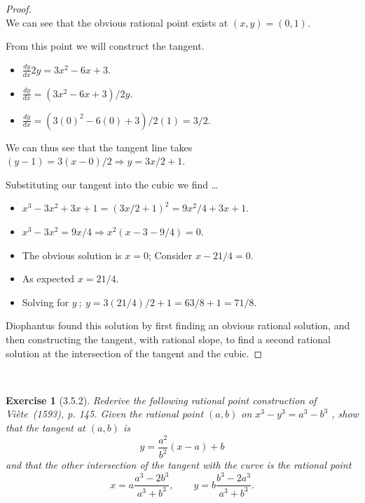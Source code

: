 \documentclass[12pt]{article}
\newcommand{\XB}{\color{black}}
\newcommand{\XBB}{\color{blue}}
\newcommand{\ds}{\displaystyle}
\theoremstyle{plain}
\newtheorem{ex}{Exercise}
\begin{document}
\begin{proof}
  \ \\

  We can see that the obvious rational point exists at $ (x, y) = (0, 1) $.

  From this point we will construct the tangent.

  \begin{itemize}
    \item $ \ds \frac{dy}{dx} 2y = 3x^{2} - 6x + 3 $.
    \item $ \ds \frac{dy}{dx} = (3x^{2} - 6x + 3) / 2y $.
    \item $ \ds \frac{dy}{dx} = (3(0)^{2} - 6(0) + 3) / 2(1) = 3 / 2 $.
  \end{itemize}

  We can thus see that the tangent line takes $ (y - 1) = 3(x - 0) / 2 \Rightarrow y = 3x/2 + 1 $.

  Substituting our tangent into the cubic we find \dots

  \begin{itemize}
    \item $ \ds x^{3} - 3x^{2} + 3x + 1 = (3x/2 + 1)^{2} = 9x^{2}/4 + 3x + 1 $.
    \item $ \ds x^{3} - 3x^{2} = 9x/4 \Rightarrow x^{2}(x - 3 - 9/4) = 0 $.
    \item The obvious solution is $ x = 0 $; Consider $ x - 21/4 = 0 $.
    \item As expected $ x = 21/4 $.
    \item Solving for $ y \ ; \ y = 3(21/4)/2 + 1 = 63/8 + 1 = 71/8 $.
  \end{itemize}

  Diophantus found this solution by first finding an obvious rational solution, and then constructing the tangent, with rational slope,
  to find a second rational solution at the intersection of the tangent and the cubic.

\end{proof}

\newpage

\XBB\hrulefill\XB \\
\begin{ex} [3.5.2]
  Rederive the following rational point construction of Vi\`{e}te~(1593), p. 145. Given the rational point $ (a, b) $ on $ x^{3} - y^{3} = a^{3} - b^{3} $ , show that the tangent at $(a,b)$ is
  \[
    y = \frac{a^{2}}{b^{2}}(x - a) + b
  \]
  \centering and that the other intersection of the tangent with the curve is the rational point
  \[
    x = a\frac{a^{3} - 2b^{3}}{a^{3} + b^{3}}, \qquad y = b\frac{b^{3} - 2a^{3}}{a^{3} + b^{3}}.
  \]
\end{ex}
\XBB\hrulefill\XB \\
\end{document}
